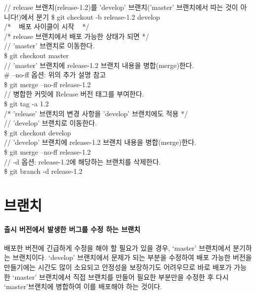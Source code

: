 \documentclass[12pt, a4paper, oneside]{book}
\let\stdsection\section
\renewcommand\section{\newpage\stdsection}
\begin{document}
		\begin{tcolorbox}
			// release 브랜치(release-1.2)를 'develop' 브랜치('master' 브랜치에서 따는 것이 아니다!)에서 분기
			\$ git checkout -b release-1.2 develop \\
			/* ~ 배포 사이클이 시작 ~ */ \\
			/* release 브랜치에서 배포 가능한 상태가 되면 */  \\
			// 'master' 브랜치로 이동한다.  \\
			\$ git checkout master  \\
			// 'master' 브랜치에 release-1.2 브랜치 내용을 병합(merge)한다. \\
			\# --no-ff 옵션: 위의 추가 설명 참고 \\
			\$ git merge --no-ff release-1.2 \\
			// 병합한 커밋에 Release 버전 태그를 부여한다. \\
			\$ git tag -a 1.2 \\
			/* 'release' 브랜치의 변경 사항을 'develop' 브랜치에도 적용 */  \\
			// 'develop' 브랜치로 이동한다.  \\
			\$ git checkout develop  \\
			// 'develop' 브랜치에 release-1.2 브랜치 내용을 병합(merge)한다.  \\
			\$ git merge --no-ff release-1.2  \\
			// -d 옵션: release-1.2에 해당하는 브랜치를 삭제한다.  \\
			\$ git branch -d release-1.2  \\
		\end{tcolorbox}

			

	\section{브랜치}



			\paragraph{출시 버전에서 발생한 버그를 수정 하는 브랜치} 
			배포한 버전에 긴급하게 수정을 해야 할 필요가 있을 경우, ‘master’ 브랜치에서 분기하는 브랜치이다. 
			‘develop’ 브랜치에서 문제가 되는 부분을 수정하여 배포 가능한 버전을 만들기에는 시간도 많이 소요되고 안정성을 보장하기도 어려우므로 
			바로 배포가 가능한 ‘master’ 브랜치에서 직접 브랜치를 만들어 필요한 부분만을 수정한 후 다시 ‘master’브랜치에 병합하여 이를 배포해야 하는 것이다.
			
\end{document}
